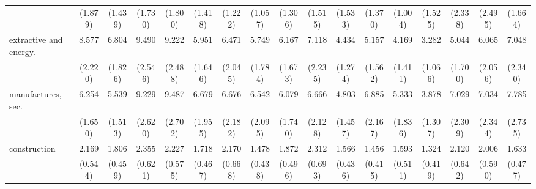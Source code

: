 {\begin{tabular}{l*{16}{c}}
                    &     (1.879)         &     (1.439)         &     (1.730)         &     (1.800)         &     (1.418)         &     (1.222)         &     (1.057)         &     (1.306)         &     (1.515)         &     (1.533)         &     (1.370)         &     (1.004)         &     (1.525)         &     (2.338)         &     (2.495)         &     (1.664)         \\
[1em]
extractive and energy.&       8.577\sym{***}&       6.804\sym{***}&       9.490\sym{***}&       9.222\sym{***}&       5.951\sym{***}&       6.471\sym{***}&       5.749\sym{***}&       6.167\sym{***}&       7.118\sym{***}&       4.434\sym{***}&       5.157\sym{***}&       4.169\sym{***}&       3.282\sym{***}&       5.044\sym{***}&       6.065\sym{***}&       7.048\sym{***}\\
                    &     (2.220)         &     (1.826)         &     (2.546)         &     (2.488)         &     (1.646)         &     (2.045)         &     (1.784)         &     (1.673)         &     (2.235)         &     (1.274)         &     (1.562)         &     (1.411)         &     (1.066)         &     (1.700)         &     (2.056)         &     (2.340)         \\
[1em]
manufactures, sec.  &       6.254\sym{***}&       5.539\sym{***}&       9.229\sym{***}&       9.487\sym{***}&       6.679\sym{***}&       6.676\sym{***}&       6.542\sym{***}&       6.079\sym{***}&       6.666\sym{***}&       4.803\sym{***}&       6.885\sym{***}&       5.333\sym{***}&       3.878\sym{***}&       7.029\sym{***}&       7.034\sym{***}&       7.785\sym{***}\\
                    &     (1.650)         &     (1.513)         &     (2.620)         &     (2.702)         &     (1.955)         &     (2.182)         &     (2.095)         &     (1.740)         &     (2.128)         &     (1.457)         &     (2.167)         &     (1.836)         &     (1.307)         &     (2.309)         &     (2.344)         &     (2.735)         \\
[1em]
construction        &       2.169\sym{**} &       1.806\sym{*}  &       2.355\sym{**} &       2.227\sym{**} &       1.718\sym{*}  &       2.170\sym{*}  &       1.478         &       1.872\sym{*}  &       2.312\sym{**} &       1.566         &       1.456         &       1.593         &       1.324         &       2.120\sym{*}  &       2.006\sym{*}  &       1.633         \\
                    &     (0.544)         &     (0.459)         &     (0.621)         &     (0.575)         &     (0.467)         &     (0.668)         &     (0.438)         &     (0.496)         &     (0.693)         &     (0.436)         &     (0.415)         &     (0.511)         &     (0.419)         &     (0.642)         &     (0.590)         &     (0.477)         \\

\end{tabular}}
